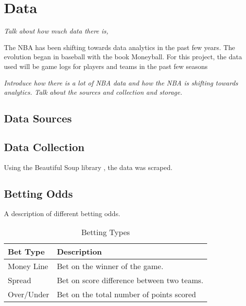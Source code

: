 \chapter{Data}\label{chapter:data}

\textit{Talk about how much data there is, }

The NBA has been shifting towards data analytics in the past few years.  The evolution began in baseball with the book Moneyball.  For this project, the data used will be game logs for players and teams in the past few seasons

\textit{Introduce how there is a lot of NBA data and how the NBA is shifting towards analytics.  Talk about the sources and collection and storage.}

\section{Data Sources}

\section{Data Collection}

Using the Beautiful Soup library \cite{beautifulsoup}, the data was scraped.

\section{Betting Odds}

A description of different betting odds. \cite{betting_odds}

\begin{table}[ht]
\centering
\begin{tabular}{|l|l|}
\hline
\textbf{Bet Type} & \textbf{Description} \\ \hline
Money Line & Bet on the winner of the game. \\ \hline
Spread & Bet on score difference between two teams. \\ \hline
Over/Under & Bet on the total number of points scored \\ \hline
\end{tabular}
\caption{Betting Types}
\label{my-label}
\end{table}
